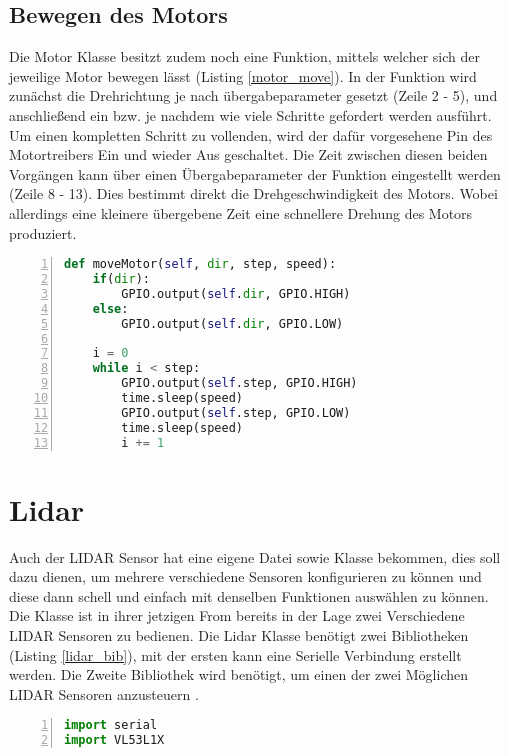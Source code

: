 \subsection{Bewegen des Motors}
Die Motor Klasse besitzt zudem noch eine Funktion, mittels welcher sich der jeweilige Motor bewegen lässt (Listing \ref{motor_move}). In der Funktion wird zunächst die Drehrichtung je nach übergabeparameter gesetzt (Zeile 2 - 5), und anschließend ein bzw. je nachdem wie viele Schritte gefordert werden ausführt. Um einen kompletten Schritt zu vollenden, wird der dafür vorgesehene Pin des Motortreibers Ein und wieder Aus geschaltet. Die Zeit zwischen diesen beiden Vorgängen kann über einen Übergabeparameter der Funktion eingestellt werden (Zeile 8 - 13). Dies bestimmt direkt die Drehgeschwindigkeit des Motors. Wobei allerdings eine kleinere übergebene Zeit eine schnellere Drehung des Motors produziert. 
\begin{lstlisting}[caption={Funktion zum Bewegen des Motors}, language={Python}, label={motor_move}, numbers=left]
def moveMotor(self, dir, step, speed):
    if(dir):
        GPIO.output(self.dir, GPIO.HIGH)
    else:
        GPIO.output(self.dir, GPIO.LOW)

    i = 0
    while i < step:
        GPIO.output(self.step, GPIO.HIGH)
        time.sleep(speed)
        GPIO.output(self.step, GPIO.LOW)
        time.sleep(speed)
        i += 1
\end{lstlisting}


\section{Lidar}
Auch der \ac{LIDAR} Sensor hat eine eigene Datei sowie Klasse bekommen, dies soll dazu dienen, um mehrere verschiedene Sensoren konfigurieren zu können und diese dann schell und einfach mit denselben Funktionen auswählen zu können.\\
Die Klasse ist in ihrer jetzigen From bereits in der Lage zwei Verschiedene \ac{LIDAR} Sensoren zu bedienen.
Die Lidar Klasse benötigt zwei Bibliotheken (Listing \ref{lidar_bib}), mit der ersten kann eine Serielle Verbindung erstellt werden. Die Zweite Bibliothek wird benötigt, um einen der zwei Möglichen \ac{LIDAR} Sensoren anzusteuern . 
\begin{lstlisting}[caption={Bibliotheken der Lidar Klasse}, language={Python}, label={lidar_bib}, numbers=left]
import serial
import VL53L1X
\end{lstlisting}

